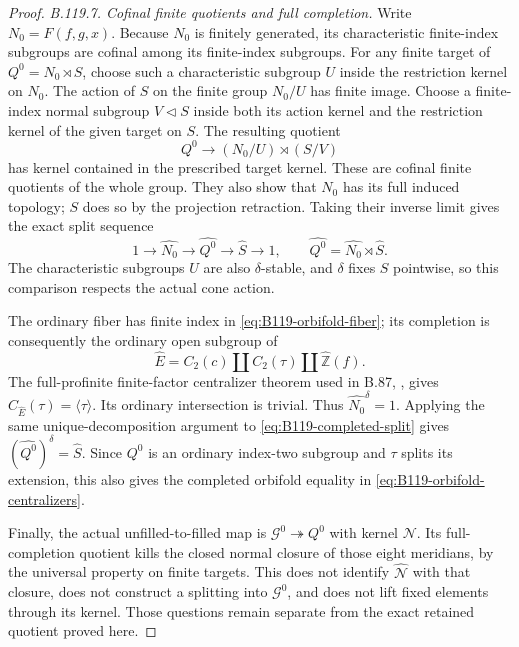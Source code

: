 \begin{proof}
\emph{B.119.7. Cofinal finite quotients and full completion.}
Write $N_0=F(f,g,x)$. Because $N_0$ is finitely generated, its
characteristic finite-index subgroups are cofinal among its
finite-index subgroups. For any finite target of $Q^0=N_0\rtimes S$,
choose such a characteristic subgroup $U$ inside the restriction
kernel on $N_0$. The action of $S$ on the finite group $N_0/U$
has finite image. Choose a finite-index normal subgroup $V\lhd S$
inside both its action kernel and the restriction kernel of the
given target on $S$. The resulting quotient
\begin{equation}\label{eq:B119-finite-cofinal}
 Q^0\longrightarrow (N_0/U)\rtimes(S/V)
\end{equation}
has kernel contained in the prescribed target kernel. These are
cofinal finite quotients of the whole group. They also show that
$N_0$ has its full induced topology; $S$ does so by the projection
retraction. Taking their inverse limit gives the exact split sequence
\begin{equation}\label{eq:B119-completed-split}
 1\longrightarrow\widehat{N_0}\longrightarrow\widehat{Q^0}
 \longrightarrow\widehat S\longrightarrow1,
 \qquad \widehat{Q^0}=\widehat{N_0}\rtimes\widehat S.
\end{equation}
The characteristic subgroups $U$ are also $\delta$-stable, and
$\delta$ fixes $S$ pointwise, so this comparison respects the
actual cone action.

The ordinary fiber has finite index in
\eqref{eq:B119-orbifold-fiber}; its completion is consequently the
ordinary open subgroup of
\[
 \widehat E=C_2(c)\amalg C_2(\tau)\amalg\widehat{\mathbb Z}(f).
\]
The full-profinite finite-factor centralizer theorem used in B.87,
\citet[Theorem B$'$]{A_HR1985}, gives
$C_{\widehat E}(\tau)=\langle\tau\rangle$. Its ordinary
intersection is trivial. Thus $\widehat{N_0}^{\delta}=1$.
Applying the same unique-decomposition argument to
\eqref{eq:B119-completed-split} gives
$(\widehat{Q^0})^\delta=\widehat S$. Since $Q^0$ is an ordinary
index-two subgroup and $\tau$ splits its extension, this also gives
the completed orbifold equality in
\eqref{eq:B119-orbifold-centralizers}.

Finally, the actual unfilled-to-filled map is
$\mathcal G^0\twoheadrightarrow Q^0$ with kernel $\mathcal N$.
Its full-completion quotient kills the closed normal closure of
those eight meridians, by the universal property on finite targets.
This does not identify $\widehat{\mathcal N}$ with that closure,
does not construct a splitting into $\mathcal G^0$, and does not
lift fixed elements through its kernel. Those questions remain
separate from the exact retained quotient proved here.
\end{proof}

